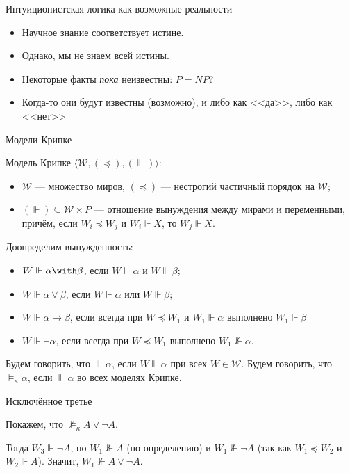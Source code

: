 \documentclass[aspectratio=169]{beamer}
\begin{document}
\begin{frame}{Интуиционистская логика как возможные реальности}
\begin{itemize}
\item Научное знание соответствует истине.
\item Однако, мы не знаем всей истины.
\item Некоторые факты \emph{пока} неизвестны: $P=NP$?
\item Когда-то они будут известны (возможно), и либо как <<да>>, либо как <<нет>>
\end{itemize}
\end{frame}

\begin{frame}{Модели Крипке}
\begin{defrus}Модель Крипке $\langle \mathcal{W}, (\preceq), (\Vdash)\rangle$:
\begin{itemize}
\item $\mathcal{W}$ --- множество миров, $(\preceq)$ --- нестрогий частичный порядок на $\mathcal{W}$;
\item $(\Vdash)\subseteq \mathcal{W}\times P$ --- отношение вынуждения
между мирами и переменными, причём, если $W_i \preceq W_j$ и $W_i \Vdash X$, то $W_j \Vdash X$.
\end{itemize}
\end{defrus}

Доопределим вынужденность:
\begin{itemize}
\item $W \Vdash \alpha\with\beta$, если $W \Vdash \alpha$ и $W \Vdash \beta$;
\item $W \Vdash \alpha\vee\beta$, если $W \Vdash \alpha$ или $W \Vdash \beta$;
\item $W \Vdash \alpha\rightarrow\beta$, если всегда при $W \preceq W_1$ и $W_1 \Vdash \alpha$ выполнено $W_1 \Vdash \beta$
\item $W \Vdash \neg\alpha$, если всегда при $W \preceq W_1$ выполнено $W_1 \not\Vdash \alpha$.
\end{itemize}

Будем говорить, что $\Vdash\alpha$, если $W\Vdash\alpha$ при всех $W \in \mathcal{W}$.
Будем говорить, что $\models_\kappa\alpha$, если $\Vdash\alpha$ во всех моделях Крипке.
\end{frame}

\begin{frame}{Исключённое третье}
\begin{exmprus}
Покажем, что $\not\models_\kappa A \vee \neg A$. 
\begin{center}\end{center}

Тогда $W_3 \Vdash \neg A$, но $W_1 \not\Vdash A$ (по определению) и $W_1 \not\Vdash \neg A$ (так как
$W_1 \preceq W_2$ и $W_2 \Vdash A$). Значит, $W_1 \not\Vdash A \vee \neg A$.
\end{exmprus}
\end{frame}
\end{document}
